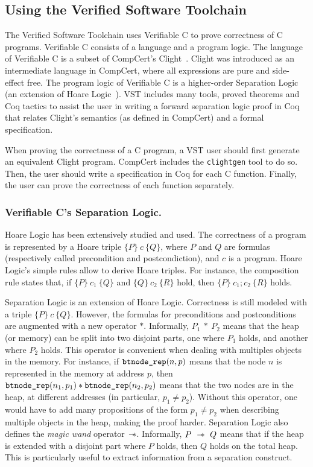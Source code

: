 \subsection{Using the Verified Software Toolchain}
The Verified Software Toolchain uses Verifiable C to prove correctness of C programs.
Verifiable C consists of a language and a program logic.
The language of Verifiable C is a subset of CompCert's Clight~\cite{clight}.
Clight was introduced as an intermediate language in CompCert, where all expressions are pure and side-effect free.
The program logic of Verifiable C is a higher-order Separation Logic~\cite{sep} (an extension of Hoare Logic~\cite{hoare}).
VST includes many tools, proved theorems and Coq tactics to assist the user in writing a forward separation logic proof in Coq that relates Clight's semantics (as defined in CompCert) and a formal specification.

When proving the correctness of a C program, a VST user should first generate an equivalent Clight program.
CompCert includes the \texttt{clightgen} tool to do so. Then, the user should write a specification in Coq for each C function.
Finally, the user can prove the correctness of each function separately.

\subsubsection{Verifiable C's Separation Logic.}
Hoare Logic has been extensively studied and used.
The correctness of a program is represented by a Hoare triple $\{P\}~c~\{Q\}$, where $P$ and $Q$ are formulas (respectively called precondition and postcondiction), and $c$ is a program.
Hoare Logic's simple rules allow to derive Hoare triples. For instance, the composition rule states that, if $\{P\}~c_1~\{Q\}$ and $\{Q\}~c_2~\{R\}$ hold, then $\{P\}~c_1;c_2~\{R\}$ holds.

Separation Logic is an extension of Hoare Logic. Correctness is still modeled with a triple $\{P\}~c~\{Q\}$. However, the formulas for preconditions and postconditions are augmented with a new operator $*$.
Informally, $P_1~*~P_2$ means that the heap (or memory) can be split into two disjoint parts, one where $P_1$ holds, and another where $P_2$ holds.
This operator is convenient when dealing with multiples objects in the memory.
For instance, if $\texttt{btnode\_rep}(n,p)$ means that the node $n$ is represented in the memory at address $p$, then $\texttt{btnode\_rep}(n_1,p_1)*\texttt{btnode\_rep}(n_2,p_2)$ means that the two nodes are in the heap, at different addresses (in particular, $p_1\neq p_2$).
Without this operator, one would have to add many propositions of the form $p_1\neq p_2$ when describing multiple objects in the heap, making the proof harder.
Separation Logic also defines the \textit{magic wand} operator $\mathrel{-\hspace{-.7ex}*}$. Informally, $P~\mathrel{-\hspace{-.7ex}*}~Q$ means that if the heap is extended with a disjoint part where $P$ holds, then $Q$ holds on the total heap.
This is particularly useful to extract information from a separation construct. 

